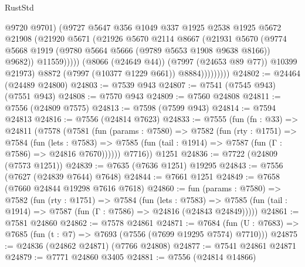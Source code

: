\begin{lexlean}{RustStd}
\begin{coremodule}
{\begin{coremodule}
{{{{{{{{{{{{{{{{{{{{{{{{{{{{{{{{{{{{{{{{{{{                              @9720
                              @9701)
                            (@9727
                              @5647
                              @356
                              @1049
                              @337
                              @1925
                              @2538
                              @1925
                              @5672
                              @21908
                              (@21920
                                @5671
                                (@21926
                                  @5670
                                  @2114
                                  @8667
                                  (@21931
                                    @5670
                                    (@9774
                                      @5668
                                      @1919
                                      (@9780 @5664 @5666 (@9789 @5653 @1908 @9638 @8166))
                                      @9682))
                                  @11559)))))
                        (@8066 (@24649 @44))
                        (@7997 (@24653 @89 @77))
                        @10399
                        @21973)
                      @8872
                      (@7997 (@10377 @1229 @661))
                      @8884)))))))))
@24802 := @24464 (@24489 @24800)
@24803 := @7539 @943
@24807 := @7541 (@7545 @943) (@7551 @943)
@24808 := @7570 @943
@24809 := @7560 @24808
@24811 := @7556 (@24809 @7575)
@24813 := @7598 (@7599 @943)
@24814 := @7594 @24813
@24816 := @7556 (@24814 @7623)
@24833 := @7555
    (fun (fn : @33) =>
    @24811
      (@7578
        (@7581
          (fun (params : @7580) =>
          @7582
            (fun (rty : @1751) =>
            @7584
              (fun (lets : @7583) =>
              @7585 (fun (tail : @1914) => @7587 (fun (Γ : @7586) => @24816 @7670))))))
        @7716))
    @1251
@24836 := @7722 (@24809 (@7573 @1251))
@24839 := @7635 (@7636 @1251) @19295
@24843 := @7556 (@7627 (@24839 @7644) @7648)
@24844 := @7661 @1251
@24849 := @7658 (@7660 @24844 @19298 @7616 @7618)
@24860 := fun (params : @7580) =>
  @7582
    (fun (rty : @1751) =>
    @7584
      (fun (lets : @7583) =>
      @7585 (fun (tail : @1914) => @7587 (fun (Γ : @7586) => @24816 (@24843 @24849)))))
@24861 := @7581 @24860
@24862 := @7578 @24861
@24871 := @7684
    (fun (U : @7683) => @7685 (fun (t : @7) => @7693 (@7556 (@7699 @19295 @7574) @7710)))
@24875 := @24836 (@24862 @24871) (@7766 @24808)
@24877 := @7541 @24861 @24871
@24879 := @7771 @24860 @3405
@24881 := @7556 (@24814 @14866)
}}}}}}}}}}}}}}}}}}}}}}}}}}}}}}}}}}}}}}}}}}}
\end{coremodule}}
\end{coremodule}
\end{lexlean}
